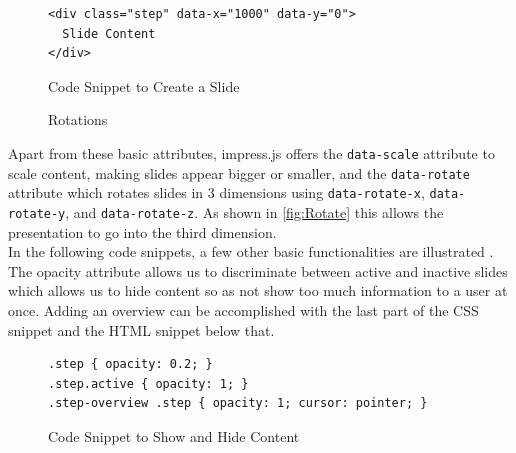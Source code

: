 \documentclass[twoside, 12pt]{article}
\begin{document}
\begin{figure}
\vspace{-26pt}
\begin{verbatim}
<div class="step" data-x="1000" data-y="0">
  Slide Content
</div>
\end{verbatim}
\vspace{-8pt}
  \caption{Code Snippet to Create a Slide}
  \label{fig:SSlide}
  \vspace{12pt}
\end{figure}

\begin{figure}
\vspace{-26pt}
  \begin{center}
  \end{center}
\vspace{-20pt}
  \caption{Rotations \cite{Rotations:npentrel14}}
  \label{fig:Rotate}
\vspace{-10pt}
\end{figure}

Apart from these basic attributes, impress.js offers the \texttt{data-scale} attribute to scale content, making slides appear bigger or smaller, and the \texttt{data-rotate} attribute which rotates slides in 3 dimensions using \texttt{data-rotate-x}, \texttt{data-rotate-y}, and \texttt{data-rotate-z}. As shown in \autoref{fig:Rotate} this allows the presentation to go into the third dimension.\\

In the following code snippets, a few other basic functionalities are illustrated \cite{andismith:npentrel15}. The opacity attribute allows us to discriminate between active and inactive slides which allows us to hide content so as not show too much information to a user at once. Adding an overview can be accomplished with the last part of the CSS snippet and the HTML snippet below that.

\begin{figure}
\vspace{0pt}
\begin{verbatim}
.step { opacity: 0.2; }
.step.active { opacity: 1; }
.step-overview .step { opacity: 1; cursor: pointer; }
\end{verbatim}
\vspace{-8pt}
  \caption{Code Snippet to Show and Hide Content}
  \label{fig:SSlide}
  \vspace{20pt}
\end{figure}
\end{document}
